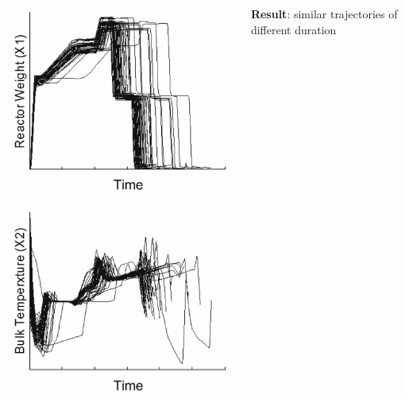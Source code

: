 \documentclass[handout, 12pt]{beamer}
\begin{document}
\begin{frame}
\begin{columns}
		\begin{center}
			\includegraphics[width=\textwidth]{images/unaligned-trajectories-many-batches.png}
		\end{center}

		\small
		\textbf{Result}: similar trajectories of different duration
\end{columns}
\end{frame}
\end{document}
